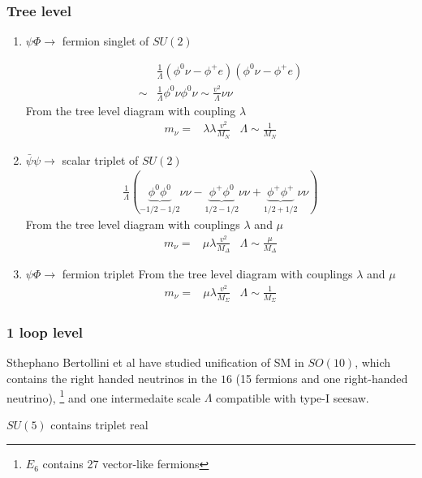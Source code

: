 \documentclass[12pt,letterpaper]{article}
\begin{document}
\subsubsection{Tree level}
\begin{enumerate}
\item $\psi\Phi\rightarrow$ fermion singlet of $SU(2)$

  \begin{align}
    &\frac{1}{\Lambda}\left( \phi^0\nu-\phi^+e \right)\left( \phi^0\nu-\phi^+e \right) \nonumber\\
    \sim& \frac{1}{\Lambda}\phi^0\nu \phi^0\nu\sim \frac{v^2}{\Lambda}\nu\nu 
  \end{align}
From the tree level diagram with coupling $\lambda$
\begin{align}
  m_{\nu}=&\lambda \lambda \frac{v^2}{M_N}& \Lambda\sim \frac{1}{M_N}
\end{align}

\item $\bar{\psi}\psi\rightarrow$ scalar triplet of $SU(2)$
  \begin{align}
    \frac{1}{\Lambda}\left(\underbrace{\phi^0\phi^0}_{-1/2-1/2}\nu\nu
    -\underbrace{\phi^+\phi^0}_{1/2-1/2}\nu\nu
    +\underbrace{\phi^+\phi^+}_{1/2+1/2}\nu\nu
  \right)
  \end{align}
From the tree level diagram with couplings $\lambda$ and $\mu$
\begin{align}
  m_{\nu}=&\mu \lambda \frac{v^2}{M_\Delta}& \Lambda\sim \frac{\mu}{M_\Delta}
\end{align}

\item $\psi\Phi\rightarrow$ fermion triplet 
From the tree level diagram with couplings $\lambda$ and $\mu$
\begin{align}
  m_{\nu}=&\mu \lambda \frac{v^2}{M_\Sigma}& \Lambda\sim \frac{1}{M_\Sigma}
\end{align}

\end{enumerate}
\subsubsection{1 loop level}
Sthephano Bertollini et al have studied unification of SM in $SO(10)$,
which contains the right handed neutrinos in the $16$ (15 fermions and
one right-handed neutrino), \footnote{$E_6$ contains 27 vector-like
  fermions} and one intermedaite scale $\Lambda$ compatible with
type-I seesaw.

$SU(5)$ contains triplet real

\end{document}
